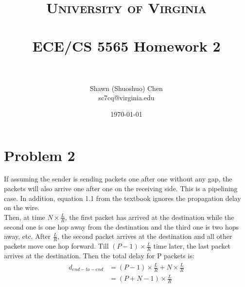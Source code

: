 \documentclass[titlepage, paper=a4, fontsize=11pt]{scrartcl} %
\title{	
\normalfont \normalsize 
\textsc{University of Virginia} \\ [25pt] %
\horrule{0.5pt} \\[0.4cm] %
\huge ECE/CS 5565 Homework 2 \\ %
\horrule{2pt} \\[0.5cm] %
}
\author{Shawn (Shuoshuo) Chen\\sc7cq@virginia.edu} %
\date{\normalsize\today} %
\numberwithin{equation}{section} %
\numberwithin{figure}{section} %
\numberwithin{table}{section} %
\begin{document}
\maketitle %


\section*{Problem 2}

If assuming the sender is sending packets one after one without any gap, the packets will also arrive one after one
on the receiving side. This is a pipelining case. In addition, equation 1.1 from the textbook ignores the propagation delay on the wire.
\\

Then, at time $N \times \frac{L}{R}$, the first packet has arrived at the destination while the second one is one hop away from the destination and the third one is two hops away, etc. After $\frac{L}{R}$, 
the second packet arrives at the destination and all other packets move one hop forward.
Till $(P-1) \times \frac{L}{R}$ time later, the last packet arrives at the destination. Then the total delay for P packets is:
\begin{align*} 
\begin{split}
d_{end-to-end} &= (P-1) \times \frac{L}{R} + N \times \frac{L}{R} \\
&= (P+N-1) \times \frac{L}{R}
\end{split}					
\end{align*}
\\


\end{document}
